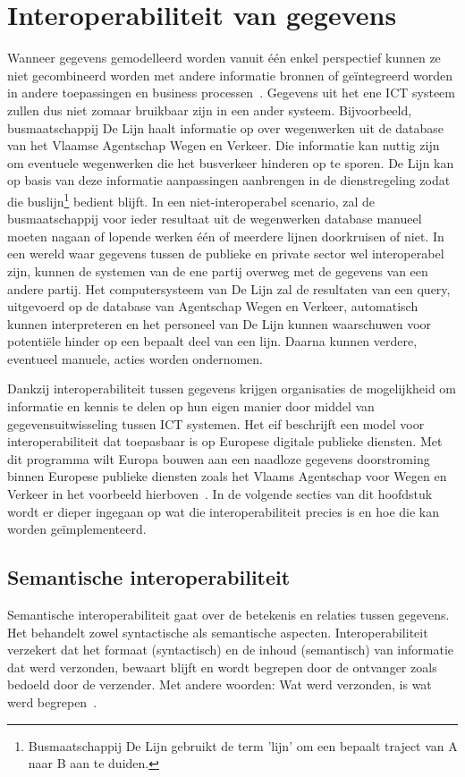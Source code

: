 \chapter{Interoperabiliteit van gegevens}
\label{chap:interoperabele_gegevens}
Wanneer gegevens gemodelleerd worden vanuit één enkel perspectief kunnen ze niet gecombineerd worden met andere informatie bronnen of geïntegreerd worden in andere toepassingen en business processen~\cite{interoperability}. Gegevens uit het ene ICT systeem zullen dus niet zomaar bruikbaar zijn in een ander systeem. Bijvoorbeeld, busmaatschappij De Lijn haalt informatie op over wegenwerken uit de database van het Vlaamse Agentschap Wegen en Verkeer. Die informatie kan nuttig zijn om eventuele wegenwerken die het busverkeer hinderen op te sporen. De Lijn kan op basis van deze informatie aanpassingen aanbrengen in de dienstregeling zodat die buslijn\footnote{Busmaatschappij De Lijn gebruikt de term 'lijn' om een bepaalt traject van A naar B aan te duiden.} bedient blijft. In een niet-interoperabel scenario, zal de busmaatschappij voor ieder resultaat uit de wegenwerken database manueel moeten nagaan of lopende werken één of meerdere lijnen doorkruisen of niet. In een wereld waar gegevens tussen de publieke en private sector wel interoperabel zijn, kunnen de systemen van de ene partij overweg met de gegevens van een andere partij. Het computersysteem van De Lijn zal de resultaten van een query, uitgevoerd op de database van Agentschap Wegen en Verkeer, automatisch kunnen interpreteren en het personeel van De Lijn kunnen waarschuwen voor potentiële hinder op een bepaalt deel van een lijn. Daarna kunnen verdere, eventueel manuele, acties worden ondernomen.

Dankzij interoperabiliteit tussen gegevens krijgen organisaties de mogelijkheid om informatie en kennis te delen op hun eigen manier door middel van gegevensuitwisseling tussen ICT systemen. Het \acrfull{eif} beschrijft een model voor interoperabiliteit dat toepasbaar is op Europese digitale publieke diensten. Met dit programma wilt Europa bouwen aan een naadloze gegevens doorstroming binnen Europese publieke diensten zoals het Vlaams Agentschap voor Wegen en Verkeer in het voorbeeld hierboven~\cite{neweif}. In de volgende secties van dit hoofdstuk wordt er dieper ingegaan op wat die interoperabiliteit precies is en hoe die kan worden geïmplementeerd.

\section{Semantische interoperabiliteit}
\label{sec:semantische_interoperabiliteit}
Semantische interoperabiliteit gaat over de betekenis en relaties tussen gegevens. Het behandelt zowel syntactische als semantische aspecten. Interoperabiliteit verzekert dat het formaat (syntactisch) en de inhoud (semantisch) van informatie dat werd verzonden, bewaart blijft en wordt begrepen door de ontvanger zoals bedoeld door de verzender. Met andere woorden: Wat werd verzonden, is wat werd begrepen~\cite{neweif}.

